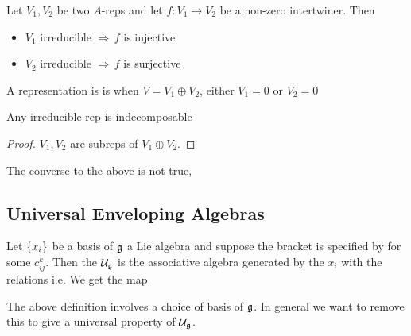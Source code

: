 \documentclass{article}
\begin{document}
\begin{lemma}[Schur]
	Let $V_1,V_2$ be two $A$-reps and let $f:V_1 \to V_2$ be a non-zero intertwiner. Then
	\begin{itemize}
		\item $V_1$ irreducible $\Rightarrow \, f$ is injective
		\item $V_2$ irreducible $\Rightarrow \, f$ is surjective 
	\end{itemize}
\end{lemma}

\begin{definition}
	A representation is  is when $V = V_1 \oplus V_2$, either $V_1 = 0$ or $V_2 = 0$
\end{definition}

\begin{prop}
	Any irreducible rep is indecomposable
\end{prop}
\begin{proof}
	$V_1, V_2 $ are subreps of $V_1 \oplus V_2$. 
\end{proof}

\begin{remark}
	The converse to the above is not true, 
\end{remark}

\subsection{Universal Enveloping Algebras}

\begin{definition}
	Let $\left\{ x_i \right\}$ be a basis of $\mathfrak{g}$ a Lie algebra and suppose the bracket is specified by 
	for some  $c_{ij}^k$. Then the  $\mathcal{U}_{\mathfrak{g}}$ is the associative algebra generated by the $x_i$ with the relations 
	i.e. 
	We get the map 
\end{definition}


The above definition involves a choice of basis of $\mathfrak{g}$. In general we want to remove this to give a universal property of $\mathcal{U}_{\mathfrak{g}}$. 
\end{document}
